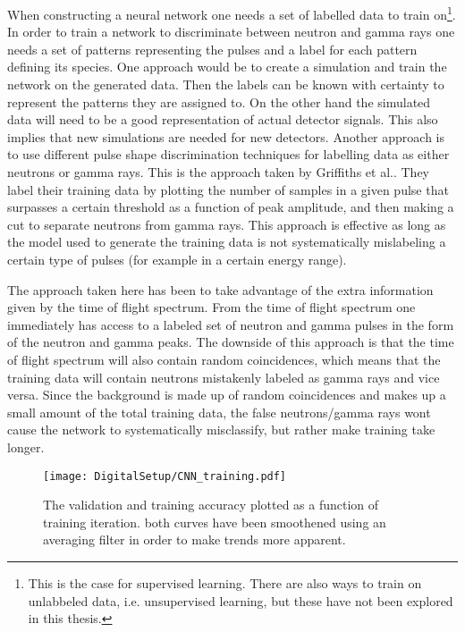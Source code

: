 \documentclass[main.tex]{subfiles}
\begin{document}
When constructing a neural network one needs a set of labelled data to train on\footnote{This is the case for supervised learning. There are also ways to train on unlabbeled data, i.e. unsupervised learning, but these have not been explored in this thesis.}. In order to train a network to discriminate between neutron and gamma rays one needs a set of patterns representing the pulses and a label for each pattern defining its species. One approach would be to create a simulation and train the network on the generated data. Then the labels can be known with certainty to represent the patterns they are assigned to. On the other hand the simulated data will need to be a good representation of actual detector signals. This also implies that new simulations are needed for new detectors. Another approach is to use different pulse shape discrimination techniques for labelling data as either neutrons or gamma rays. This is the approach taken by  Griffiths et al.\cite{Griffiths}. They label their training data by plotting the number of samples in a given pulse that surpasses a certain threshold as a function of peak amplitude, and then making a cut to separate neutrons from gamma rays. This approach is effective as long as the model used to generate the training data is not systematically mislabeling a certain type of pulses (for example in a certain energy range). 

The approach taken here has been to take advantage of the extra information given by the time of flight spectrum. From the time of flight spectrum one immediately has access to a labeled set of neutron and gamma pulses in the form of the neutron and gamma peaks. The downside of this approach is that the time of flight spectrum will also contain random coincidences, which means that the training data will contain neutrons mistakenly labeled as gamma rays and vice versa. Since the background is made up of random coincidences and makes up a small amount of the total training data, the false neutrons/gamma rays wont cause the network to systematically misclassify, but rather make training take longer.

\begin{figure}[ht!]
    \centering
        \texttt{[image: DigitalSetup/CNN\_training.pdf]}
        \caption[Training and validation accuracy of the CNN]{The validation and training accuracy plotted as a function of training iteration. both curves have been smoothened using an averaging filter in order to make trends more apparent.}
    \label{fig:CNN_training} 
\end{figure}
\end{document}
